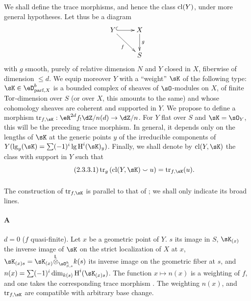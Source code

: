\subsubsection{}\label{IV:2-3-3}

We shall define the trace morphisms, and hence the class $\operatorname{cl}(Y)$, under more
general hypotheses. Let thus be a diagram
\[\xymatrix{
  Y \ar@{^{(}->}[r] \ar[dr]_-f
    & X \ar[d]^-g \\
  & S
}\]
with $g$ smooth, purely of relative dimension $N$ and $Y$ closed in $X$,
fiberwise of dimension $\leqslant d$. We equip moreover $Y$ with a
``weight'' $\sK$ of the following type: $\sK\in\eD_{\text{parf},X}^b$ is a
bounded complex of sheaves of $\sO$-modules on $X$, of finite $\operatorname{Tor}$-dimension
over $S$ (or over $X$, this amounts to the same) and whose cohomology
sheaves are coherent and supported in $Y$. We propose to
define a morphism $\tr_{f,\sK}:\eR^{2 d}f_! \dZ/n(d) \to \dZ/n$. For $Y$
flat over $S$ and $\sK=\sO_Y$, this will be the preceding trace morphism. In
general, it depends only on the lengths of $\sK$ at the
generic points $y$ of the irreducible components of
$Y(\operatorname{lg}_y(\sK) = \sum (-1)^i \operatorname{lg} \h^i(\sK)_y)$.
Finally, we shall denote by $\cl(Y,\sK)$ the class with support in $Y$ such that
\begin{equation*}\tag{2.3.3.1}\label{IV:eq:2-3-3-1}
  \tr_g\left(\cl(Y,\sK)\smallsmile u\right) = \tr_{f,\sK}(u) \text{.}
\end{equation*}




\subsubsection{}\label{IV:2-3-4}

The construction of $\tr_{f,\sK}$ is parallel to that of
\cite[XVIII.2]{sga4}; we shall only indicate its broad lines.

\paragraph{A}
$d=0$ ($f$ quasi-finite). Let $x$ be a geometric point of $Y$. $s$ its image
in $S$, $\sK_{(x)}$ the inverse image of $\sK$ on the strict localization
of $X$ at $x$, $\sK_{(x)s} = \sK_{(x)}\lotimes_{\sO_{S,s}^h} k(s)$ its inverse
image on the geometric fiber at $s$, and
$n(x)=\sum (-1)^i \dim_{k(s)} \h^i(\sK_{(x)s})$. The function $x\mapsto n(x)$
is a weighting of $f$, and one takes the corresponding trace morphism
\cite[XVII.6.2.5]{sga4}. The weighting $n(x)$, and $\tr_{f,\sK}$ are
compatible with arbitrary base change.

